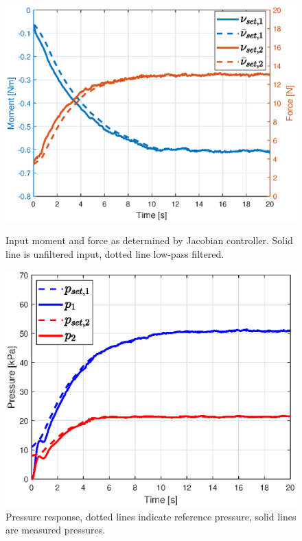 \clearpage


\begin{figure}[H] 
    \begin{minipage}[b]{0.49\linewidth}
     \centering
    \includegraphics[width=\linewidth]{Figures/Chapter5/jacinputstepleft.eps} 
    \caption{Input moment and force as determined by Jacobian controller. Solid line is unfiltered input, dotted line low-pass filtered. } 
    \label{fig5:nuleft} 
       \end{minipage} 
    \begin{minipage}[b]{0.49\linewidth}
     \centering
    \includegraphics[width=\linewidth]{Figures/Chapter5/pressurestepleft.eps} 
    \caption{Pressure response, dotted lines indicate reference pressure, solid lines are measured pressures.} 
    \label{fig5:pleft} 
    \end{minipage} 
\end{figure}

